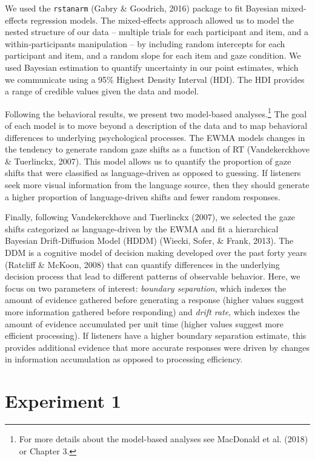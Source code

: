 \documentclass[man,floatsintext]{apa6}
\let\rmarkdownfootnote\footnote%
\def\footnote{\protect\rmarkdownfootnote}
\begin{document}
We used the \texttt{rstanarm} (Gabry \& Goodrich, 2016) package to fit
Bayesian mixed-effects regression models. The mixed-effects approach
allowed us to model the nested structure of our data -- multiple trials
for each participant and item, and a within-participants manipulation --
by including random intercepts for each participant and item, and a
random slope for each item and gaze condition. We used Bayesian
estimation to quantify uncertainty in our point estimates, which we
communicate using a 95\% Highest Density Interval (HDI). The HDI
provides a range of credible values given the data and model.

Following the behavioral results, we present two model-based
analyses.\footnote{For more details about the model-based analyses see
  MacDonald et al. (2018) or Chapter 3.} The goal of each model is to
move beyond a description of the data and to map behavioral differences
to underlying psychological processes. The EWMA models changes in the
tendency to generate random gaze shifts as a function of RT
(Vandekerckhove \& Tuerlinckx, 2007). This model allows us to quantify
the proportion of gaze shifts that were classified as language-driven as
opposed to guessing. If listeners seek more visual information from the
language source, then they should generate a higher proportion of
language-driven shifts and fewer random responses.

Finally, following Vandekerckhove and Tuerlinckx (2007), we selected the
gaze shifts categorized as language-driven by the EWMA and fit a
hierarchical Bayesian Drift-Diffusion Model (HDDM) (Wiecki, Sofer, \&
Frank, 2013). The DDM is a cognitive model of decision making developed
over the past forty years (Ratcliff \& McKoon, 2008) that can quantify
differences in the underlying decision process that lead to different
patterns of observable behavior. Here, we focus on two parameters of
interest: \emph{boundary separation}, which indexes the amount of
evidence gathered before generating a response (higher values suggest
more information gathered before responding) and \emph{drift rate},
which indexes the amount of evidence accumulated per unit time (higher
values suggest more efficient processing). If listeners have a higher
boundary separation estimate, this provides additional evidence that
more accurate responses were driven by changes in information
accumulation as opposed to processing efficiency.

\section{Experiment 1}\label{experiment-1}
\end{document}
